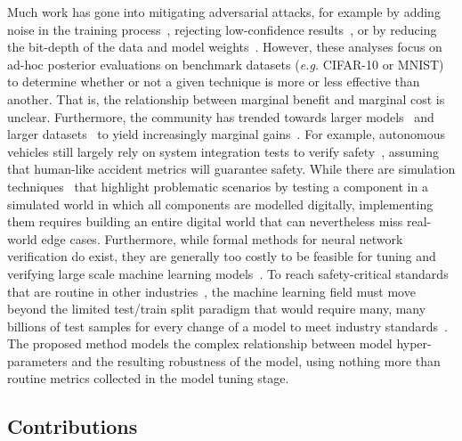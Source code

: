 Much work has gone into mitigating adversarial attacks, for example by adding noise in the training process~\cite{gauss_aug,gauss_out}, rejecting low-confidence results~\cite{high_conf}, or by reducing the bit-depth of the data and model weights~\cite{feature_squeezing}. However, these analyses focus on ad-hoc posterior evaluations on benchmark datasets (\textit{e.g.} CIFAR-10 or MNIST) to determine whether or not a given technique is more or less effective than another. That is, the relationship between marginal benefit and marginal cost is unclear. Furthermore, the community has trended towards larger models~\cite{desislavov2021compute} and larger datasets~\cite{desislavov2021compute,bailly2022effects} to yield increasingly marginal gains~\cite{sun2017revisiting}. For example, autonomous vehicles still largely rely on system integration tests to verify safety~\cite{vehicle_testing_review}, assuming that human-like accident metrics will guarantee safety. While there are simulation techniques~\cite{vehicle_formal} that highlight problematic scenarios by testing a component in a simulated world in which all components are modelled digitally, implementing them requires building an entire digital world that can nevertheless miss real-world edge cases. Furthermore, while formal methods for neural network verification do exist, they are generally too costly to be feasible for tuning and verifying large scale machine learning models~\cite{formal_adversarial}.
To reach safety-critical standards that are routine in other industries~\cite{iso26262,IEC61508,IEC62034}, the machine learning field must move beyond the limited test/train split paradigm that would require many, many billions of test samples for every change of a model to meet industry standards~\cite{meyers}.
The proposed method models the complex relationship between model hyper-parameters and the resulting robustness of the model, using nothing more than routine metrics collected in the model tuning stage.

\subsection{Contributions}

